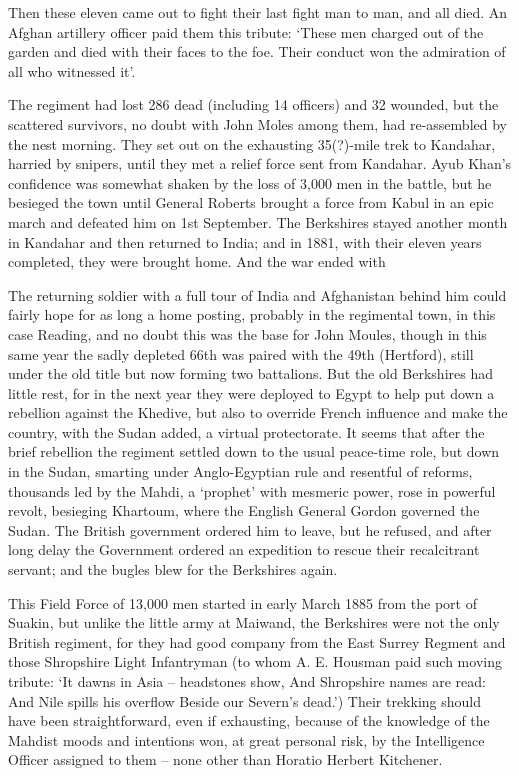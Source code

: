Then these eleven came out to fight their last fight man to man, and all died. An Afghan artillery officer paid them this tribute: ‘These men charged out of the garden and died with their faces to the foe. Their conduct won the admiration of all who witnessed it’.

The regiment had lost 286 dead (including 14 officers) and 32 wounded, but the scattered survivors, no doubt with John Moles among them, had re-assembled by the nest morning. They set out on the exhausting 35(?)-mile trek to Kandahar, harried by snipers, until they met a relief force sent from Kandahar. Ayub Khan’s confidence was somewhat shaken by the loss of 3,000 men in the battle, but he besieged the town until General Roberts brought a force from Kabul in an epic march and defeated him on 1st September. The Berkshires stayed another month in Kandahar and then returned to India; and in 1881, with their eleven years completed, they were brought home. And the war ended with 

The returning soldier with a full tour of India and Afghanistan behind him could fairly hope for as long a home posting, probably in the regimental town, in this case Reading, and no doubt this was the base for John Moules, though in this same year the sadly depleted 66th was paired with the 49th (Hertford), still under the old title but now forming two battalions. But the old Berkshires had little rest, for in the next year they were deployed to Egypt to help put down a rebellion against the Khedive, but also to override French influence and make the country, with the Sudan added, a virtual protectorate. 	 It seems that after the brief rebellion the regiment settled down to the usual peace-time role, but down in the Sudan, smarting under Anglo-Egyptian rule and resentful of reforms, thousands led by the Mahdi, a ‘prophet’ with mesmeric power, rose in powerful revolt, besieging Khartoum, where the English General Gordon governed the Sudan. The British government ordered him to leave, but he refused, and after long delay the Government ordered an expedition to rescue their recalcitrant servant; and the bugles blew for the Berkshires again. 

This Field Force of 13,000 men started in early March 1885 from the port of Suakin, but unlike the little army at Maiwand, the Berkshires were not the only British regiment, for they had good company from the East Surrey Regment and those Shropshire Light Infantryman (to whom A. E. Housman paid such moving tribute: ‘It dawns in Asia – headstones show, And Shropshire names are read: And Nile spills his overflow Beside our Severn’s dead.’) Their trekking should have been straightforward, even if exhausting, because of the knowledge of the Mahdist moods and intentions won, at great personal risk, by the Intelligence Officer assigned to them – none other than Horatio Herbert Kitchener. 

